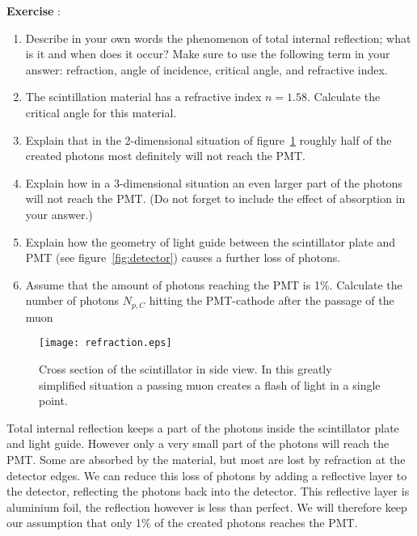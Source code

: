 \begin{shaded}
\textbf{Exercise \theExercise {}} :
\begin{enumerate}[-]
\item Describe in your own words the phenomenon of total internal reflection; what is it and when does it occur? Make sure to use the following term in your answer: refraction, angle of incidence, critical angle, and refractive index.
\item The scintillation material has a refractive index $n=1.58$. Calculate the critical angle for this material.
\item Explain that in the 2-dimensional situation of figure~\ref{fig:refraction} roughly half of the created photons most definitely will not reach the PMT.
\item Explain how in a 3-dimensional situation an even larger part of the photons will not reach the PMT. (Do not forget to include the effect of absorption in your answer.)
\item Explain how the geometry of light guide between the scintillator plate and PMT (see figure~\ref{fig:detector}) causes a further loss of photons.
\item Assume that the amount of photons reaching the PMT is 1\%. Calculate the number of photons $N_{p,C}$ hitting the PMT-cathode after the passage of the muon
\end{enumerate}
\end{shaded}

\begin{figure}\begin{center}
\texttt{[image: refraction.eps]}%
\caption{Cross section of the scintillator in side view. In this greatly simplified situation a passing muon creates a flash of light in a single point.}\label{fig:refraction}
\end{center}\end{figure}

Total internal reflection keeps a part of the photons inside the scintillator plate and light guide. However only a very small part of the photons will reach the PMT. Some are absorbed by the material, but most are lost by refraction at the detector edges. We can reduce this loss of photons by adding a reflective layer to the detector, reflecting the photons back into the detector. This reflective layer is aluminium foil, the reflection however is less than perfect. We will therefore keep our assumption that only 1\% of the created photons reaches the PMT.


